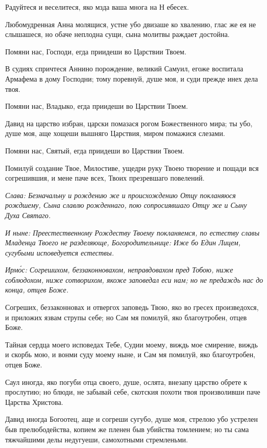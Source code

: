 Радуйтеся и веселитеся, яко мзда ваша многа на Н ебесех.

Любомудренная Анна молящися, устне убо двизаше ко хвалению, глас же ея не слышашеся, но обаче неплодна сущи, сына молитвы раждает достойна.

Помяни нас, Господи, егда приидеши во Царствии Твоем.

В судиях спричтеся Аннино порождение, великий Самуил, егоже воспитала Армафема в дому Господни; тому поревнуй, душе моя, и суди прежде инех дела твоя.

Помяни нас, Владыко, егда приидеши во Царствии Твоем.

Давид на царство избран, царски помазася рогом Божественного мира; ты убо, душе моя, аще хощеши вышняго Царствия, миром помажися слезами.

Помяни нас, Святый, егда приидеши во Царствии Твоем.

Помилуй создание Твое, Милостиве, ущедри руку Твоею творение и пощади вся согрешившия, и мене паче всех, Твоих презревшаго повелений.

\itshape Слава\normalfont{}: Безначальну и рождению же и происхождению Отцу покланяюся рождшему, Сына славлю рожденнаго, пою сопросиявшаго Отцу же и Сыну Духа Святаго.

\itshape И ныне\normalfont{}: Преестественному Рождеству Твоему покланяемся, по естеству славы Младенца Твоего не разделяюще, Богородительнице: Иже бо Един Лицем, сугубыми исповедуется естествы. 


\itshape Ирм\'{о}с\normalfont{}: Согрешихом, беззаконновахом, неправдовахом пред Тобою, ниже соблюдохом, ниже сотворихом, якоже заповедал еси нам; но не предаждь нас до конца, отцев Боже.

Согреших, беззаконновах и отвергох заповедь Твою, яко во гресех произведохся, и приложих язвам струпы себе; но Сам мя помилуй, яко благоутробен, отцев Боже.

Тайная сердца моего исповедах Тебе, Судии моему, виждь мое смирение, виждь и скорбь мою, и вонми суду моему ныне, и Сам мя помилуй, яко благоутробен, отцев Боже.

Саул иногда, яко погуби отца своего, душе, ослята, внезапу царство обрете к прослутию; но блюди, не забывай себе, скотския похоти твоя произволивши паче Царства Христова.

Давид иногда Богоотец, аще и согреши сугубо, душе моя, стрелою убо устрелен быв прелюбодейства, копием же пленен быв убийства томлением; но ты сама тяжчайшими делы недугуеши, самохотными стремленьми.

